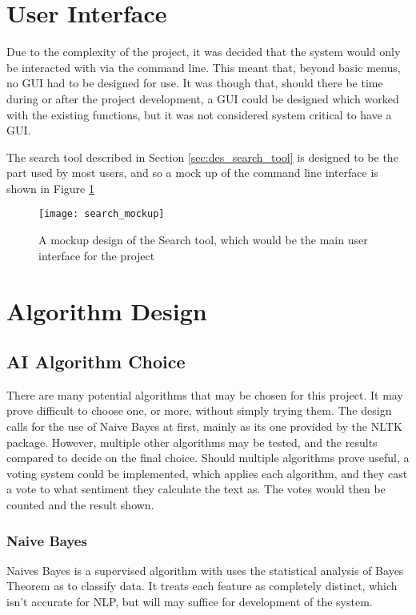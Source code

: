 \section{User Interface}
\label{sec:des_user_interface}
Due to the complexity of the project, it was decided that the system would only be interacted with via the command line. This meant that, beyond basic menus, no GUI had to be designed for use. It was though that, should there be time during or after the project development, a GUI could be designed which worked with the existing functions, but it was not considered system critical to have a GUI.

The search tool described in Section \ref{sec:des_search_tool} is designed to be the part used by most users, and so a mock up of the command line interface is shown in Figure \ref{fig:search_mockup}

\begin{figure}[ht]
\texttt{[image: search\_mockup]}
\caption{A mockup design of the Search tool, which would be the main user interface for the project}
\label{fig:search_mockup}
\end{figure}

\section{Algorithm Design}
\label{sec:des_algorithm}

\subsection{AI Algorithm Choice}
\label{sec:des_AI_algorithm}
There are many potential algorithms that may be chosen for this project. It may prove difficult to choose one, or more, without simply trying them. The design calls for the use of Naive Bayes at first, mainly as its one provided by the NLTK package. However, multiple other algorithms may be tested, and the results compared to decide on the final choice. Should multiple algorithms prove useful, a voting system could be implemented, which applies each algorithm, and they cast a vote to what sentiment they calculate the text as. The votes would then be counted and the result shown.

\subsubsection{Naive Bayes}
\label{sec:des_naive_bayes}
Naives Bayes is a supervised algorithm with uses the statistical analysis of Bayes Theorem as to classify data. It treats each feature as completely distinct, which isn't accurate for NLP, but will may suffice for development of the system.

